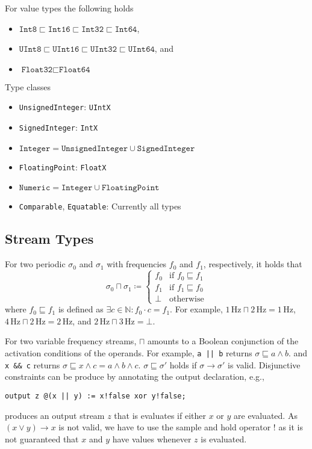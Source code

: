 \documentclass{article}
\newcommand{\nats}{\mathbb{N}}
\newcommand{\type}[1]{\texttt{#1}}
\begin{document}
For value types the following holds
\begin{itemize}
  \item $\type{Int8} \sqsubset \type{Int16} \sqsubset \type{Int32} \sqsubset \type{Int64}$,
  \item $\type{UInt8} \sqsubset \type{UInt16} \sqsubset \type{UInt32} \sqsubset \type{UInt64}$, and
  \item $\type{Float32} \sqsubset \type{Float64}$
\end{itemize}

Type classes
\begin{itemize}
  \item \type{UnsignedInteger}: \type{UIntX}
  \item \type{SignedInteger}: \type{IntX}
  \item $\type{Integer} = \type{UnsignedInteger} \cup \type{SignedInteger}$
  \item \type{FloatingPoint}: \type{FloatX}
  \item $\type{Numeric} = \type{Integer} \cup \type{FloatingPoint}$
  \item \type{Comparable}, \type{Equatable}: Currently all types
\end{itemize}

\subsection{Stream Types}

For two periodic $\sigma_0$ and $\sigma_1$ with frequencies $f_0$ and $f_1$, respectively, it holds that
\begin{equation*}
  \sigma_0 \sqcap \sigma_1 \coloneqq
  \begin{cases}
    f_0 & \text{if } f_0 \sqsubseteq f_1 \\
    f_1 & \text{if } f_1 \sqsubseteq f_0 \\
    \bot & \text{otherwise}
  \end{cases}
\end{equation*}
where $f_0 \sqsubseteq f_1$ is defined as $\exists c \in \nats \colon f_0 \cdot c = f_1$.
%
For example, $1\,\text{Hz} \sqcap 2\,\text{Hz} = 1\,\text{Hz}$, $4\,\text{Hz} \sqcap 2\,\text{Hz} = 2\,\text{Hz}$, and $2\,\text{Hz} \sqcap 3\,\text{Hz} = \bot$.

For two variable frequency streams, $\sqcap$ amounts to a Boolean conjunction of the activation conditions of the operands.
%
For example, \texttt{a || b} returns $\sigma \sqsubseteq a \land b$. and \texttt{x \&\& c} returns $\sigma \sqsubseteq x \land c = a \land b \land c$.
$\sigma \sqsubseteq \sigma'$ holds if $\sigma \rightarrow \sigma'$ is valid.
Disjunctive constraints can be produce by annotating the output declaration, e.g.,
\begin{lstlisting}
output z @(x || y) := x!false xor y!false;
\end{lstlisting}
produces an output stream $z$ that is evaluates if either $x$ or $y$ are evaluated.
As $(x \lor y) \rightarrow x$ is not valid, we have to use the sample and hold operator $!$ as it is not guaranteed that $x$ and $y$ have values whenever $z$ is evaluated.
\end{document}
